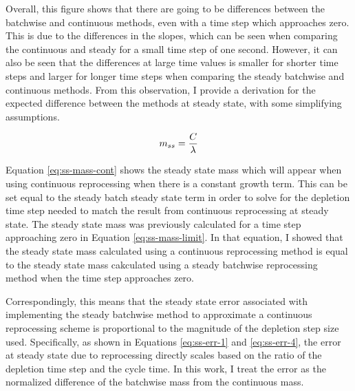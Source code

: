 Overall, this figure shows that there are going to be differences between the batchwise and continuous methods, even with a time step which approaches zero. This is due to the differences in the slopes, which can be seen when comparing the continuous and steady for a small time step of one second. However, it can also be seen that the differences at large time values is smaller for shorter time steps and larger for longer time steps when comparing the steady batchwise and continuous methods. From this observation, I provide a derivation for the expected difference between the methods at steady state, with some simplifying assumptions.

\begin{equation} \hfill 
m_{ss} = \frac{C}{\lambda}
\hfill\label{eq:ss-mass-cont} \end{equation}

Equation \eqref{eq:ss-mass-cont} shows the steady state mass which will appear when using continuous reprocessing when there is a constant growth term. This can be set equal to the steady batch steady state term in order to solve for the depletion time step needed to match the result from continuous reprocessing at steady state. 
The steady state mass was previously calculated for a time step approaching zero in Equation \eqref{eq:ss-mass-limit}.
In that equation, I showed that the steady state mass calculated using a continuous reprocessing method is equal to the steady state mass cakculated using a steady batchwise reprocessing method when the time step approaches zero.


Correspondingly, this means that the steady state error associated with implementing the steady batchwise method to approximate a continuous reprocessing scheme is proportional to the magnitude of the depletion step size used. Specifically, as shown in Equations \eqref{eq:ss-err-1} and \eqref{eq:ss-err-4}, the error at steady state due to reprocessing directly scales based on the ratio of the depletion time step and the cycle time. In this work, I treat the error as the normalized difference of the batchwise mass from the continuous mass.

